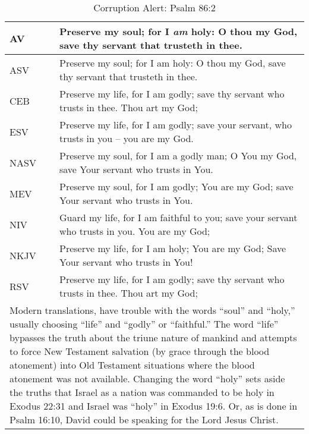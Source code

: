 \newpage
\begin{center}

\begin{table}[ht]
\centering
\begin{tabular}{|p{.5in}|p{3.5in}|}
\hline

\textcolor[rgb]{0.00,0.00,1.00}{AV} & \textcolor[rgb]{0.00,0.00,1.00}{Preserve my soul; for I \emph{am} holy: O thou my God, save thy servant that trusteth in thee.} \\ \hline 

\hline
\hline


ASV &  Preserve my soul; for I am holy: O thou my God, save thy servant that trusteth in thee.\\ \hline
%
CEB &  Preserve my life, for I am godly;   save thy servant who trusts in thee. Thou art my God;\\ \hline
%
ESV &  Preserve my life, for I am godly; save your servant, who trusts in you -- you are my God. \\ \hline
%
NASV & Preserve my soul, for I am a godly man; O You my God, save Your servant who trusts in You.\\ \hline
%
MEV & Preserve my soul, for I am godly; You are my God; save Your servant who trusts in You.\\ \hline
%
NIV &  Guard my life, for I am faithful to you; save your servant who trusts in you. You are my God;\\ \hline
%
NKJV &  Preserve my life, for I am holy; You are my God; Save Your servant who trusts in You!\\ \hline
%
RSV &  Preserve my life, for I am godly; save thy servant who trusts in thee. Thou art my God; \\ \hline

\hline
\hline

\multicolumn{2}{|p{4.3in}|}{{\textcolor{jungle}{Modern translations, have trouble with the words ``soul'' and ``holy,'' usually choosing ``life'' and ``godly'' or ``faithful.''  The word ``life'' bypasses the truth about the triune nature of mankind and attempts to force New Testament salvation (by grace through the blood atonement) into Old Testament situations where the blood atonement was not available.  Changing the word ``holy'' sets aside the truths that Israel as a nation was commanded to be holy in Exodus 22:31 and Israel was ``holy'' in Exodus 19:6.  Or, as is done in Psalm 16:10, David could be speaking for the Lord Jesus Christ.}}} \\ \hline

\end{tabular}
\caption[Corruption Alert: Psalm 86:2]{Corruption Alert: Psalm 86:2} \label{table:Corruption Psalm 86:2}

\end{table}

\end{center}


